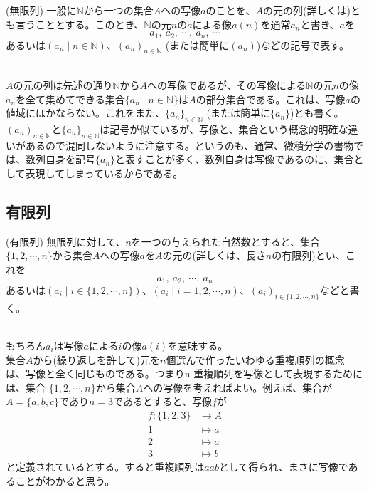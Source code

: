 \documentclass[a4j]{jsarticle}
\begin{document}
\begin{itembox}[l]{ (無限列)}
	一般に$\mathbb{N}$から一つの集合$A$への写像$a$のことを、$A$の元の列(詳しくは)とも言うこととする。このとき、$\mathbb{N}$の元$n$の$a$による像$a(n)$を通常$a_n$と書き、$a$を$$ a_1,\:a_2,\:\cdots,\:a_n,\:\cdots $$あるいは$(a_n \mid n \in \mathbb{N})$、$(a_n)_{n \in \mathbb{N}}$ (または簡単に$(a_n)$)などの記号で表す。
\end{itembox}\\

$A$の元の列は先述の通り$\mathbb{N}$から$A$への写像であるが、その写像による$\mathbb{N}$の元$n$の像$a_n$を全て集めてできる集合$\{a_n \mid n \in \mathbb{N}\}$は$A$の部分集合である。これは、写像$a$の値域にほかならない。これをまた、$\{a_n\}_{n \in \mathbb{N}}$ (または簡単に$\{a_n\}$)とも書く。\\

 $(a_n)_{n \in \mathbb{N}}$と$\{a_n\}_{n \in \mathbb{N}}$は記号が似ているが、写像と、集合という概念的明確な違いがあるので混同しないように注意する。というのも、通常、微積分学の書物では、数列自身を記号$\{a_n\}$と表すことが多く、数列自身は写像であるのに、集合として表現してしまっているからである。

\subsection{有限列}

\begin{itembox}[l]{ (有限列)}
	無限列に対して、$n$を一つの与えられた自然数とすると、集合$\{1,2,\cdots,n\}$から集合$A$への写像$a$を$A$の元の(詳しくは、長さ$n$の有限列)とい、これを$$ a_1,\:a_2,\:\cdots,\:a_n$$あるいは$(a_i \mid i \in \{1,2,\cdots,n\})$、$(a_i \mid i = 1,2,\cdots,n)$、$(a_i)_{i \in \{1,2,\cdots,n\}}$などと書く。
\end{itembox}\\

もちろん$a_i$は写像$a$による$i$の像$a(i)$を意味する。\\

 集合$A$から(繰り返しを許して)元を$n$個選んで作ったいわゆる重複順列の概念は、写像と全く同じものである。つまりn-重複順列を写像として表現するためには、集合
$\{1,2,\cdots,n\}$から集合$A$への写像を考えればよい。例えば、集合が$A=\{a,b,c\}$であり$n=3$であるとすると、写像$f$が
\begin{align*}
	f : \{1,2,3\} & \rightarrow A \\
	1             & \mapsto a     \\
	2             & \mapsto a     \\
	3             & \mapsto b
\end{align*}
と定義されているとする。すると重複順列は$aab$として得られ、まさに写像であることがわかると思う。
\end{document}
